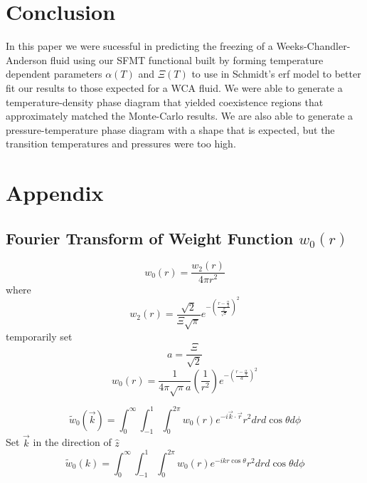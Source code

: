 \documentclass[double,12pt]{beavtex}
\begin{document}

\chapter{Conclusion}
In this paper we were sucessful in predicting the freezing of a 
Weeks-Chandler-Anderson fluid using our SFMT functional built by 
forming temperature dependent parameters $\alpha(T)$ and $\Xi(T)$ to use 
in Schmidt's erf model to better fit our results to those expected for a
WCA fluid. We were able to generate a temperature-density 
phase diagram that yielded coexistence regions that approximately 
matched the Monte-Carlo
results. 
We are also able to generate a pressure-temperature
phase diagram with a shape that is expected, but the transition 
temperatures and pressures were too high. 



\backmatter

\chapter{Appendix}

\section{Fourier Transform of Weight Function $w_0(r)$}
\begin{equation}{w_0(r)=\frac{w_2(r)}{4{\pi}r^2}}\end{equation}
where
\begin{equation}{w_2(r)=\frac{\sqrt{2}}{\Xi\sqrt{\pi}}e^{-\left(\frac{r-\frac{\alpha}{2}}{\frac{\Xi}{\sqrt{2}}}\right)^2}}\end{equation}
temporarily set 
\begin{equation}{a=\frac{\Xi}{\sqrt{2}}}\end{equation}
\begin{equation}{w_0(r)=\frac{1}{4{\pi}\sqrt{\pi}a}\left(\frac{1}{r^2}\right)e^{-\left(\frac{r-\frac{\alpha}{2}}{a}\right)^2}}\end{equation}

\begin{equation}{\widetilde{w}_0(\vec{k})=\int_{0}^{\infty}\int_{-1}^{1}\int_{0}^{2\pi}w_0(r)e^{-i\vec{k}\cdot{\vec{r}}}r^2d{r}d{\cos\theta}d{\phi}}\end{equation}
Set $\vec{k}$ in the direction of $\hat{z}$ 
\begin{equation}{\widetilde{w}_0(k)=\int_{0}^{\infty}\int_{-1}^{1}\int_{0}^{2\pi}w_0(r)e^{-ikr\cos\theta}r^2d{r}d{\cos\theta}d{\phi}}\end{equation}
\end{document}
